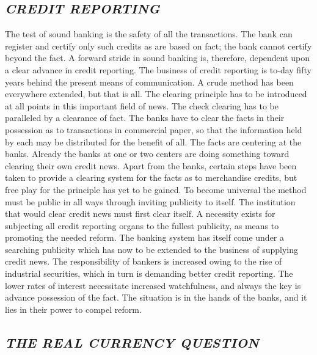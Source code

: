 \documentclass[openany,nobib]{tufte-book}
\begin{document}
\hypertarget{credit-reporting}{%
\subsection{\texorpdfstring{\emph{CREDIT
REPORTING}}{CREDIT REPORTING}}\label{credit-reporting}}

The test of sound banking is the safety of all the transactions. The
bank can register and certify only such credits as are based on fact;
the bank cannot certify beyond the fact. A forward stride in sound
banking is, therefore, dependent upon a clear advance in credit
reporting. The business of credit reporting is to-day fifty years behind
the present means of communication. A crude method has been everywhere
extended, but that is all. The clearing principle has to be introduced
at all points in this important field of news. The check clearing has to
be paralleled by a clearance of fact. The banks have to clear the facts
in their possession as to transactions in commercial paper, so that the
information held by each may be distributed for the benefit of all. The
facts are centering at the banks. Already the banks at one or two
centers are doing something toward clearing their own credit news. Apart
from the banks, certain steps have been taken to provide a clearing
system for the facts as to merchandise credits, but free play for the
principle has yet to be gained. To become universal the method must be
public in all ways through inviting publicity to itself. The institution
that would clear credit news must first clear itself. A necessity exists
for subjecting all credit reporting organs to the fullest publicity, as
means to promoting the needed reform. The banking system has itself come
under a searching publicity which has now to be extended to the business
of supplying credit news. The responsibility of bankers is increased
owing to the rise of industrial securities, which in turn is demanding
better credit reporting. The lower rates of interest necessitate
increased watchfulness, and always the key is advance possession of the
fact. The situation is in the hands of the banks, and it lies in their
power to compel reform. ~~

\hypertarget{the-real-currency-question}{%
\subsection{\texorpdfstring{\emph{THE REAL CURRENCY
QUESTION}}{THE REAL CURRENCY QUESTION}}\label{the-real-currency-question}}
\end{document}
